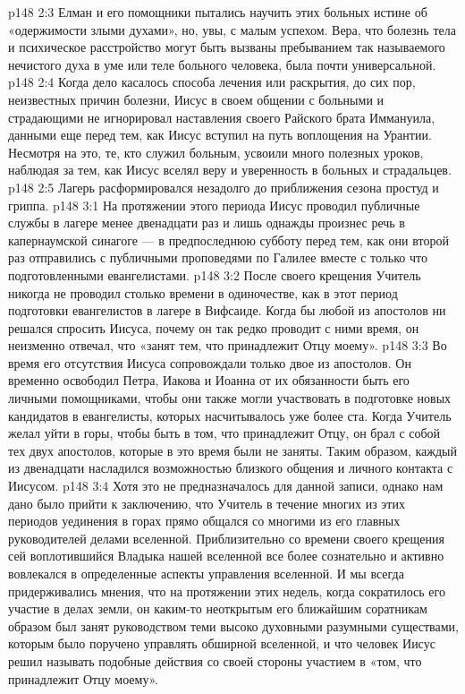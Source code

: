 \vs p148 2:3 Елман и его помощники пытались научить этих больных истине об «одержимости злыми духами», но, увы, с малым успехом. Вера, что болезнь тела и психическое расстройство могут быть вызваны пребыванием так называемого нечистого духа в уме или теле больного человека, была почти универсальной.
\vs p148 2:4 Когда дело касалось способа лечения или раскрытия, до сих пор, неизвестных причин болезни, Иисус в своем общении с больными и страдающими не игнорировал наставления своего Райского брата Иммануила, данными еще перед тем, как Иисус вступил на путь воплощения на Урантии. Несмотря на это, те, кто служил больным, усвоили много полезных уроков, наблюдая за тем, как Иисус вселял веру и уверенность в больных и страдальцев.
\vs p148 2:5 Лагерь расформировался незадолго до приближения сезона простуд и гриппа.
\vs p148 3:1 На протяжении этого периода Иисус проводил публичные службы в лагере менее двенадцати раз и лишь однажды произнес речь в капернаумской синагоге --- в предпоследнюю субботу перед тем, как они второй раз отправились с публичными проповедями по Галилее вместе с только что подготовленными евангелистами.
\vs p148 3:2 После своего крещения Учитель никогда не проводил столько времени в одиночестве, как в этот период подготовки евангелистов в лагере в Вифсаиде. Когда бы любой из апостолов ни решался спросить Иисуса, почему он так редко проводит с ними время, он неизменно отвечал, что «занят тем, что принадлежит Отцу моему».
\vs p148 3:3 Во время его отсутствия Иисуса сопровождали только двое из апостолов. Он временно освободил Петра, Иакова и Иоанна от их обязанности быть его личными помощниками, чтобы они также могли участвовать в подготовке новых кандидатов в евангелисты, которых насчитывалось уже более ста. Когда Учитель желал уйти в горы, чтобы быть в том, что принадлежит Отцу, он брал с собой тех двух апостолов, которые в это время были не заняты. Таким образом, каждый из двенадцати насладился возможностью близкого общения и личного контакта с Иисусом.
\vs p148 3:4 Хотя это не предназначалось для данной записи, однако нам дано было прийти к заключению, что Учитель в течение многих из этих периодов уединения в горах прямо общался со многими из его главных руководителей делами вселенной. Приблизительно со времени своего крещения сей воплотившийся Владыка нашей вселенной все более сознательно и активно вовлекался в определенные аспекты управления вселенной. И мы всегда придерживались мнения, что на протяжении этих недель, когда сократилось его участие в делах земли, он каким\hyp{}то неоткрытым его ближайшим соратникам образом был занят руководством теми высоко духовными разумными существами, которым было поручено управлять обширной вселенной, и что человек Иисус решил называть подобные действия со своей стороны участием в «том, что принадлежит Отцу моему».

